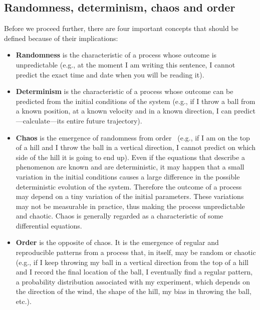 \documentclass[justified, sixbynine]{tufte-book}
\theoremstyle{plain}%
\newtheorem * {corollary}{Corollary}
\theoremstyle{definition}
\theoremstyle{remark}
\newtheorem * {remark}{Remark}
\newtheorem * {note}{Note}
\begin{document}
\begin{fullwidth}
\goodbreak\section{Randomness, determinism, chaos and order}

Before we proceed further, there are four important concepts that should be defined because of their implications:

\begin{itemize}
\item  {\bf Randomness} is the characteristic of a process whose outcome is
unpredictable (e.g., at the moment I am writing this sentence, I cannot
predict the exact time and date when you will be reading it).

\item  {\bf Determinism} is the characteristic of a process whose outcome
can be predicted from the initial conditions of the system (e.g., if I throw a
ball from a known position, at a known velocity and in a known direction, I
can predict---calculate---its entire future trajectory).

\item  {\bf Chaos} is the emergence of randomness from order~\cite{lorenz}
(e.g., if I am on the
top of a hill and I throw the ball in a vertical direction, I cannot predict on
which side of the hill it is going to end up). Even if the equations that
describe a phenomenon are known and are deterministic, it may happen that a
small variation in the initial conditions causes a large difference in the
possible deterministic evolution of the system. Therefore the outcome of a
process may depend on a tiny variation of the initial parameters. These
variations may not be measurable in practice, thus making the process
unpredictable and chaotic. Chaos is generally regarded as a characteristic
of some differential equations.

\item  {\bf Order} is the opposite of chaos. It is the emergence of regular
and reproducible patterns from a process that, in itself, may be random or
chaotic (e.g., if I keep throwing my ball in a vertical direction from
the top of a hill and I record the final location of the ball, I eventually
find a regular pattern, a probability distribution associated with my
experiment, which depends on the direction of the wind, the shape of the
hill, my bias in throwing the ball, etc.).
\end{itemize}


\end{fullwidth}
\end{document}
